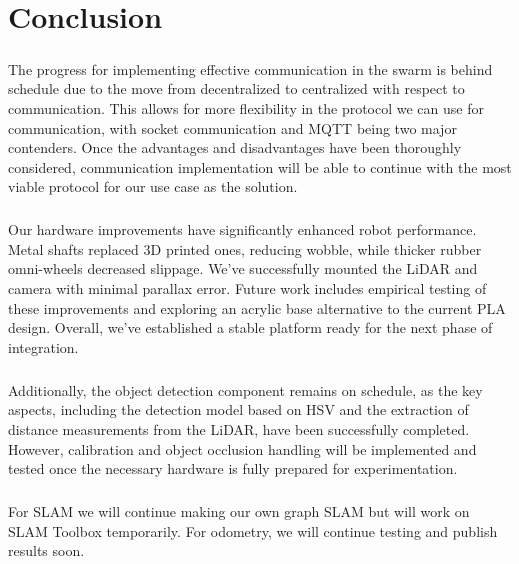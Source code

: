 \chapter{Conclusion}

\paragraph*{}
The progress for implementing effective communication in the swarm is behind schedule due to the move from decentralized to centralized with respect to communication. This allows for more flexibility in the protocol we can use for communication, with socket communication and MQTT being two major contenders. Once the advantages and disadvantages have been thoroughly considered, communication implementation will be able to continue with the most viable protocol for our use case as the solution.
\paragraph*{}
Our hardware improvements have significantly enhanced robot performance. Metal shafts replaced 3D printed ones, reducing wobble, while thicker rubber omni-wheels decreased slippage. We've successfully mounted the LiDAR and camera with minimal parallax error. Future work includes empirical testing of these improvements and exploring an acrylic base alternative to the current PLA design. Overall, we've established a stable platform ready for the next phase of integration.

\paragraph*{}
Additionally, the object detection component remains on schedule, as the key aspects, including the detection model based on HSV and the extraction of distance measurements from the LiDAR, have been successfully completed. However, calibration and object occlusion handling will be implemented and tested once the necessary hardware is fully prepared for experimentation.

\paragraph*{}
For SLAM we will continue making our own graph SLAM but will work on SLAM Toolbox temporarily. For odometry, we will continue testing and publish results soon.

